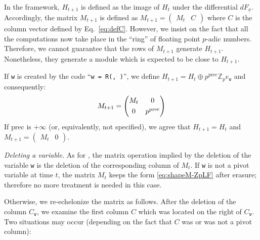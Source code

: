 \documentclass[sigconf]{acmart}
\newcommand{\ph}{\vphantom{$A^A_A$}}
\newcommand{\Z}{\mathbb Z}
\newcommand{\Zp}{\Z_p}
\newcommand{\ttv}{\texttt{v}\xspace}
\newcommand{\ttw}{\texttt{w}\xspace}
\newcommand{\ZpLC}{\text{\color{output} \rm \tt ZpLC}\xspace}
\newcommand{\ZpLF}{\text{\color{output} \rm \tt ZpLF}\xspace}
\theoremstyle{definition}
\begin{document}
In the \ZpLF framework, $H_{t+1}$ is defined as the image of $H_t$
under the differential $dF_{\underline x}$. Accordingly, the matrix
$M_{t+1}$ is defined as $M_{t+1} = \left(\begin{matrix}
M_t & C \end{matrix}\right)$
where $C$ is the column vector defined by Eq.~\eqref{eq:defC}.
However, we insist on the fact that all the computations now take
place in the ``ring'' of floating point $p$-adic numbers. Therefore,
we cannot guarantee that the rows of $M_{t+1}$ generate $H_{t+1}$.
Nonetheless, they generate a module which is expected to be close
to $H_{t+1}$.

\smallskip

If \ttw is created by the code
``\verb?w = ?\verb?R(?\verb?, ?\verb?)?'',
we define $H_{t+1} = H_t \oplus p^{\text{prec}} \Zp e_\ttw$ and consequently:
$$M_{t+1} = \left(\begin{matrix}
M_t & 0 \smallskip \\ 0 & p^{\text{prec}}
\end{matrix}\right)$$
If $\text{prec}$ is $+\infty$ (or, equivalently, not specified), we
agree that $H_{t+1} = H_t$ and $M_{t+1} = (\begin{matrix} M_t & 0 
\end{matrix})$.

\medskip

\noindent \textit{Deleting a variable.} 
% 
As for \ZpLC, the matrix operation implied by the deletion of the 
variable \ttw is the deletion of the corresponding column of $M_t$. If 
\ttw is not a pivot variable at time $t$, the matrix $M_t$ keeps the 
form \eqref{eq:shapeM-ZpLF} after erasure; therefore no more treatment 
is needed in this case.

Otherwise, we re-echelonize the matrix as follows. After the deletion 
of the column $C_\ttw$, we examine the first column $C$ which was 
located on the right of $C_\ttw$. Two situations may occur (depending
on the fact that $C$ was or was not a pivot column):

\noindent \hfill
{}
\hfill\null
\end{document}
